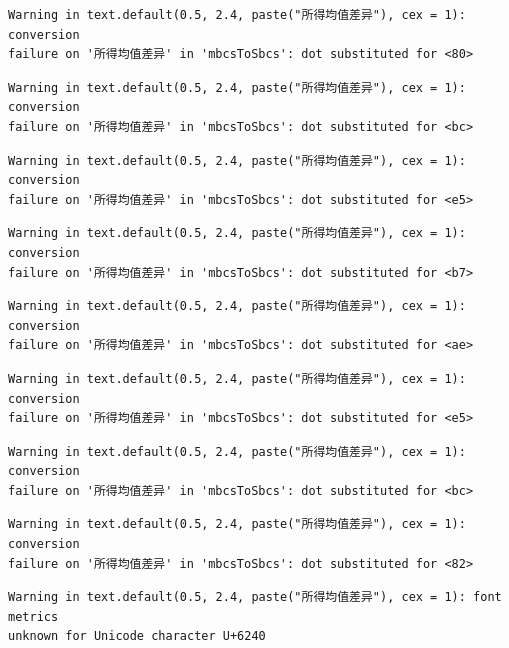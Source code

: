 \documentclass[
  letterpaper,
  DIV=11,
  numbers=noendperiod]{scrreprt}
\begin{document}
\begin{verbatim}
Warning in text.default(0.5, 2.4, paste("所得均值差异"), cex = 1): conversion
failure on '所得均值差异' in 'mbcsToSbcs': dot substituted for <80>
\end{verbatim}

\begin{verbatim}
Warning in text.default(0.5, 2.4, paste("所得均值差异"), cex = 1): conversion
failure on '所得均值差异' in 'mbcsToSbcs': dot substituted for <bc>
\end{verbatim}

\begin{verbatim}
Warning in text.default(0.5, 2.4, paste("所得均值差异"), cex = 1): conversion
failure on '所得均值差异' in 'mbcsToSbcs': dot substituted for <e5>
\end{verbatim}

\begin{verbatim}
Warning in text.default(0.5, 2.4, paste("所得均值差异"), cex = 1): conversion
failure on '所得均值差异' in 'mbcsToSbcs': dot substituted for <b7>
\end{verbatim}

\begin{verbatim}
Warning in text.default(0.5, 2.4, paste("所得均值差异"), cex = 1): conversion
failure on '所得均值差异' in 'mbcsToSbcs': dot substituted for <ae>
\end{verbatim}

\begin{verbatim}
Warning in text.default(0.5, 2.4, paste("所得均值差异"), cex = 1): conversion
failure on '所得均值差异' in 'mbcsToSbcs': dot substituted for <e5>
\end{verbatim}

\begin{verbatim}
Warning in text.default(0.5, 2.4, paste("所得均值差异"), cex = 1): conversion
failure on '所得均值差异' in 'mbcsToSbcs': dot substituted for <bc>
\end{verbatim}

\begin{verbatim}
Warning in text.default(0.5, 2.4, paste("所得均值差异"), cex = 1): conversion
failure on '所得均值差异' in 'mbcsToSbcs': dot substituted for <82>
\end{verbatim}

\begin{verbatim}
Warning in text.default(0.5, 2.4, paste("所得均值差异"), cex = 1): font metrics
unknown for Unicode character U+6240
\end{verbatim}
\end{document}
